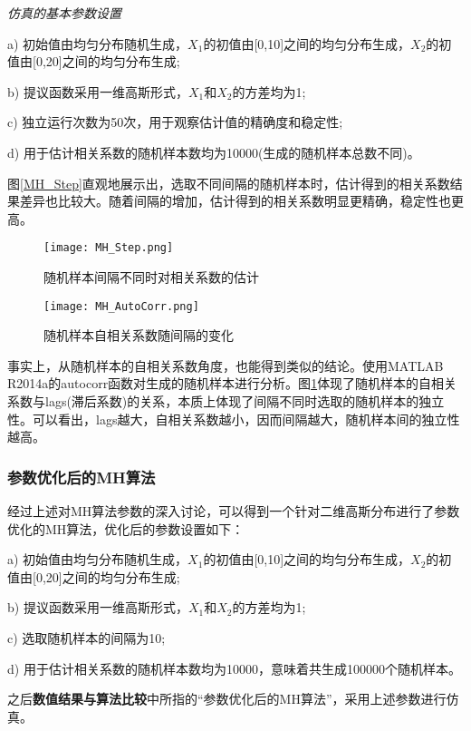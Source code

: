 \documentclass[11pt]{article}
\begin{document}
\noindent\emph{仿真的基本参数设置}

a) 初始值由均匀分布随机生成，$X_{1}$的初值由[0,10]之间的均匀分布生成，$X_{2}$的初值由[0,20]之间的均匀分布生成;

b) 提议函数采用一维高斯形式，$X_{1}$和$X_{2}$的方差均为1;

c) 独立运行次数为50次，用于观察估计值的精确度和稳定性;

d) 用于估计相关系数的随机样本数均为10000(生成的随机样本总数不同)。

图\ref{MH_Step}直观地展示出，选取不同间隔的随机样本时，估计得到的相关系数结果差异也比较大。随着间隔的增加，估计得到的相关系数明显更精确，稳定性也更高。

\begin{figure}
\begin{minipage}[t]{0.5\linewidth}
    \centering
    \texttt{[image: MH\_Step.png]}
    \caption{\scriptsize{随机样本间隔不同时对相关系数的估计}}
    \label{MH_Step}
\end{minipage}
\begin{minipage}[t]{0.5\linewidth}
    \centering
    \texttt{[image: MH\_AutoCorr.png]}
    \caption{\scriptsize{随机样本自相关系数随间隔的变化}}
    \label{MH_AutoCorr}
\end{minipage}
\end{figure}

事实上，从随机样本的自相关系数角度，也能得到类似的结论。使用MATLAB R2014a的autocorr函数对生成的随机样本进行分析。图\ref{MH_AutoCorr}体现了随机样本的自相关系数与lags(滞后系数)的关系，本质上体现了间隔不同时选取的随机样本的独立性。可以看出，lags越大，自相关系数越小，因而间隔越大，随机样本间的独立性越高。

\subsubsection{参数优化后的MH算法}
经过上述对MH算法参数的深入讨论，可以得到一个针对二维高斯分布进行了参数优化的MH算法，优化后的参数设置如下：

a) 初始值由均匀分布随机生成，$X_{1}$的初值由[0,10]之间的均匀分布生成，$X_{2}$的初值由[0,20]之间的均匀分布生成;

b) 提议函数采用一维高斯形式，$X_{1}$和$X_{2}$的方差均为1;

c) 选取随机样本的间隔为10;

d) 用于估计相关系数的随机样本数均为10000，意味着共生成100000个随机样本。

之后\textbf{数值结果与算法比较}中所指的“参数优化后的MH算法”，采用上述参数进行仿真。
\end{document}
